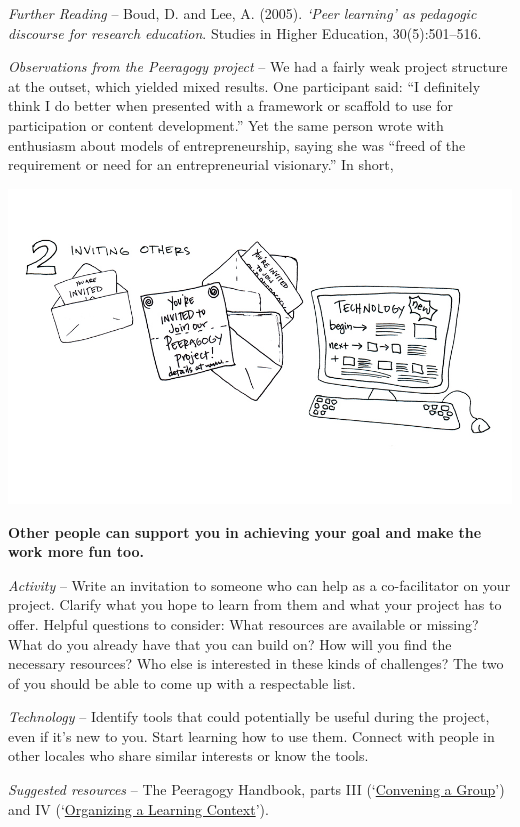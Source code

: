 \emph{Further Reading} -- Boud, D. and Lee, A. (2005). \emph{`Peer
learning' as pedagogic discourse for research education}. Studies in
Higher Education, 30(5):501--516.

\emph{Observations from the Peeragogy project} -- We had a fairly weak
project structure at the outset, which yielded mixed results. One
participant said: ``I definitely think I do better when presented with a
framework or scaffold to use for participation or content development.''
Yet the same person wrote with enthusiasm about models of
entrepreneurship, saying she was ``freed of the requirement or need for
an entrepreneurial visionary.'' In short,

\begin{center}
\includegraphics{../pictures/OpenBook-2-2.jpg}
\end{center}

\textbf{Other people can support you in achieving your goal and make the
work more fun too.}

\emph{Activity} -- Write an invitation to someone who can help as a
co-facilitator on your project. Clarify what you hope to learn from them
and what your project has to offer. Helpful questions to consider: What
resources are available or missing? What do you already have that you
can build on? How will you find the necessary resources? Who else is
interested in these kinds of challenges? The two of you should be able
to come up with a respectable list.

\emph{Technology} -- Identify tools that could potentially be useful
during the project, even if it's new to you. Start learning how to use
them. Connect with people in other locales who share similar interests
or know the tools.

\emph{Suggested resources} -- The Peeragogy Handbook, parts III
(`\href{http://peeragogy.org/convening-a-group/}{Convening a Group}')
and IV
(`\href{http://peeragogy.org/organizing-a-learning-context/}{Organizing
a Learning Context}').

